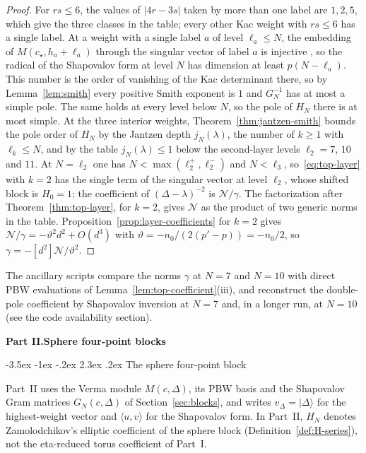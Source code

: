 \documentclass[twoside,10pt]{article}
\makeatletter
\numberwithin{equation}{section}
\theoremstyle{slbody}
\theoremstyle{definition}
\theoremstyle{remark}
\renewcommand{\section}{%
  \@startsection{section}{1}{\z@}%
    {-3.5ex \@plus -1ex \@minus -.2ex}%
    {2.3ex \@plus .2ex}%
    {\normalfont\large\bfseries}}
\makeatother
\begin{document}
\begin{proof}
For \(rs\leq6\), the values of \(|4r-3s|\) taken by more than one label are
\(1,2,5\), which give the three classes in the table; every other Kac weight
with \(rs\leq6\) has a single label.  At a weight with a single label \(a\)
of level \(\ell_a\leq N\), the embedding of \(M(c_\star,h_a+\ell_a)\) through
the singular vector of label \(a\) is injective \cite[the paragraph preceding
Corollary~5.2]{IoharaKoga2011}, so the radical of the Shapovalov form at
level \(N\) has dimension at least \(p(N-\ell_a)\).  This number is the order
of vanishing of the Kac determinant there, so by Lemma~\ref{lem:smith} every
positive Smith exponent is \(1\) and \(G_N^{-1}\) has at most a simple pole.
The same holds at every level below \(N\), so the pole of \(H_N\) there is
at most simple.  At the three interior weights,
Theorem~\ref{thm:jantzen-smith} bounds the pole order of \(H_N\) by the
Jantzen depth \(j_N(\lambda)\), the number of \(k\geq1\) with
\(\ell_k\leq N\), and by the table \(j_N(\lambda)\leq1\) below the
second-layer levels \(\ell_2=7\), \(10\) and \(11\).  At \(N=\ell_2\) one
has \(N<\max(\ell^+_2,\ell^-_2)\) and \(N<\ell_3\), so~\eqref{eq:top-layer}
with \(k=2\) has the single term of the singular vector at level \(\ell_2\),
whose shifted block is \(H_0=1\); the coefficient of \((\Delta-\lambda)^{-2}\)
is \(\mathcal N/\gamma\).  The factorization after
Theorem~\ref{thm:top-layer}, for \(k=2\), gives \(\mathcal N\) as the product
of two generic norms in the table.  Proposition~\ref{prop:layer-coefficients}
for \(k=2\) gives \(\mathcal N/\gamma=-\vartheta^2d^2+O(d^3)\) with
\(\vartheta=-n_0/(2(p'-p))=-n_0/2\), so \(\gamma=-[d^2]\mathcal N/\vartheta^2\).
\end{proof}

The ancillary scripts compare the norms \(\gamma\) at \(N=7\) and \(N=10\)
with direct PBW evaluations of Lemma~\ref{lem:top-coefficient}(iii), and
reconstruct the double-pole coefficient by Shapovalov inversion at \(N=7\)
and, in a longer run, at \(N=10\) (see the code availability section).
\begin{center}\large\bfseries Part II.\enspace Sphere four-point blocks\end{center}

\section{The sphere four-point block}\label{sec:setup-sph}

Part~II uses the Verma module \(M(c,\Delta)\), its PBW basis and the
Shapovalov Gram matrices \(G_N(c,\Delta)\) of Section~\ref{sec:blocks}, and
writes \(v_\Delta=\lvert\Delta\rangle\) for the highest-weight vector and
\(\langle u,v\rangle\) for the Shapovalov form.  In Part~II, \(H_N\) denotes
Zamolodchikov's elliptic coefficient of the sphere block
(Definition~\ref{def:H-series}), not the eta-reduced torus coefficient of
Part~I.
\end{document}
